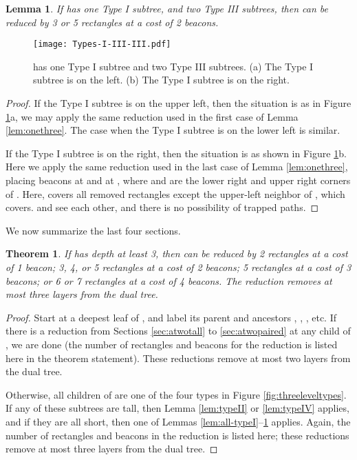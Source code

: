 \documentclass{article}
\newtheorem{thm}{Theorem}[section]
\newtheorem{lemma}{Lemma}
\begin{document}
		
		\begin{lemma}\label{lem:onethreethree}
			If  has one Type I subtree, and two Type III subtrees,
			then  can be reduced by 3 or 5 rectangles at a cost of 2 beacons.
		\end{lemma}
		\begin{figure}[htbp] 
			\begin{center}
				\texttt{[image: Types-I-III-III.pdf]} 
			\end{center}
			\caption{  has one Type I subtree and two Type III subtrees.
					  (a) The Type I subtree is on the left.
					  (b) The Type I subtree is on the right.
					}
			\label{fig:onethreethree}
		\end{figure}  
		
		\begin{proof}
			If the Type I subtree is on the upper left, then the situation is
			as in Figure \ref{fig:onethreethree}a, we may
			apply the same reduction used in the first case of Lemma \ref{lem:onethree}.
			The case when the Type I subtree is on the lower left is similar.
			
			If the Type I subtree is on the right, then the situation is as shown
			in Figure \ref{fig:onethreethree}b.
			Here we apply the same reduction used in the last case of Lemma
			\ref{lem:onethree}, placing beacons  at  and
			 at , where  and  are the lower right and
			upper right corners of .
			Here,  covers all removed rectangles except the
			upper-left neighbor of , which  covers.
			 and  see each other, and there is no possibility of trapped paths.
		\end{proof}
	
		We now summarize the last four sections.
		
		\begin{thm}\label{thm:casesummary}
			If  has depth at least 3, then  can be reduced by 2 rectangles at a
			cost of 1 beacon; 3, 4, or 5 rectangles at a cost of 2 beacons;  5 rectangles
			at a cost of 3 beacons; or 6 or 7 rectangles at a cost of 4 beacons.
			The reduction removes at most three layers from the dual tree.
		\end{thm}
		\begin{proof}
			Start at a deepest leaf  of , and label its parent and ancestors
			, , , etc.  If there is a reduction from Sections
			\ref{sec:atwotall} to \ref{sec:atwopaired} at any child of ,
			we are done (the number of rectangles and beacons for the reduction is
			listed here in the theorem statement).  These reductions remove at most two
			layers from the dual tree.
			
			Otherwise, all children of  are one of the four types in Figure
			\ref{fig:threeleveltypes}.
			If any of these subtrees are tall, then Lemma \ref{lem:typeII} or
			\ref{lem:typeIV} applies, and if they are all short, then one of Lemmas
			\ref{lem:all-typeI}--\ref{lem:onethreethree} applies.
			Again, the number of rectangles and beacons in the reduction is listed here;
			these reductions remove at most three layers from the dual tree.
		\end{proof}
		
\end{document}
